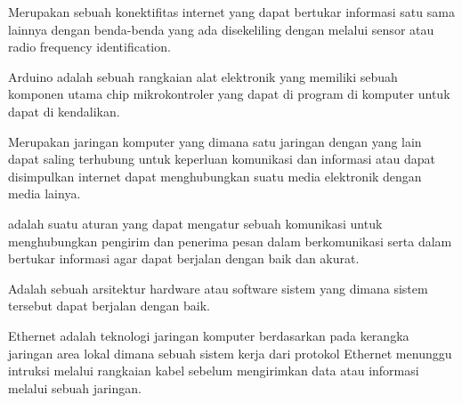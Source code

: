 Merupakan sebuah konektifitas internet yang dapat bertukar informasi satu sama lainnya dengan benda-benda yang ada disekeliling dengan melalui sensor atau radio frequency identification.

Arduino adalah sebuah rangkaian alat elektronik yang memiliki sebuah komponen utama chip mikrokontroler yang dapat di program di komputer untuk dapat di kendalikan.

Merupakan jaringan komputer yang dimana satu jaringan dengan yang lain dapat saling terhubung untuk keperluan komunikasi dan informasi atau dapat disimpulkan internet dapat menghubungkan suatu media elektronik dengan media lainya.

adalah suatu aturan yang dapat mengatur sebuah komunikasi untuk menghubungkan pengirim dan penerima pesan dalam berkomunikasi serta dalam bertukar informasi agar dapat berjalan dengan baik dan akurat.

Adalah sebuah arsitektur hardware atau software sistem yang dimana sistem tersebut dapat berjalan dengan baik.

 Ethernet adalah teknologi jaringan komputer berdasarkan pada kerangka jaringan area lokal  dimana sebuah sistem kerja dari protokol Ethernet menunggu intruksi melalui rangkaian kabel sebelum mengirimkan data atau informasi melalui sebuah jaringan.

